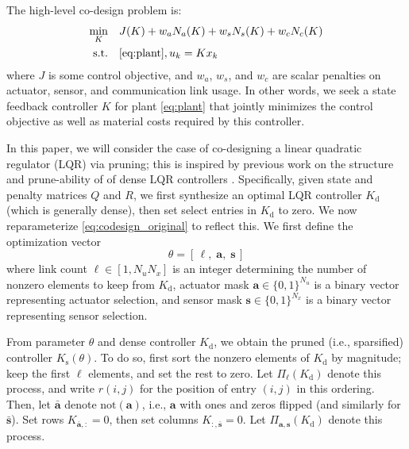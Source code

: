 \documentclass[letterpaper, 10pt, conference]{ieeeconf}
\begin{document}
The high-level co-design problem is:
\begin{equation} \label{eq:codesign_original}
\begin{aligned}
\min_{K} & \quad J(K) + w_a N_a(K) + w_s N_s(K) + w_c N_c(K) \\
\mathrm{s. t.} & \quad \eqref{eq:plant}, u_k = Kx_k
\end{aligned}
\end{equation}
where $J$ is some control objective, and $w_a$, $w_s$, and $w_c$ are scalar penalties on actuator, sensor, and communication link usage. In other words, we seek a state feedback controller $K$ for plant \eqref{eq:plant} that jointly minimizes the control objective as well as material costs required by this controller.

In this paper, we will consider the case of co-designing a linear quadratic regulator (LQR) via pruning; this is inspired by previous work on the structure and prune-ability of of dense LQR controllers \cite{shin}. Specifically, given state and penalty matrices $Q$ and $R$, we first synthesize an optimal LQR controller $K_\mathrm{d}$ (which is generally dense), then set select entries in $K_\mathrm{d}$ to zero. We now reparameterize \eqref{eq:codesign_original} to reflect this. We first define the optimization vector 
\begin{equation}
\theta = [\,\ell, \;\mathbf{a}, \;\mathbf{s}\,]
\end{equation}
where link count $\ell \in [1, N_u N_x]$ is an integer determining the number of nonzero elements to keep from $K_\mathrm{d}$, actuator mask $\mathbf{a} \in \{0, 1\}^{N_u}$ is a binary vector representing actuator selection, and sensor mask $\mathbf{s} \in \{0, 1\}^{N_x}$ is a binary vector representing sensor selection.

From parameter $\theta$ and dense controller $K_\mathrm{d}$, we obtain the pruned (i.e., sparsified) controller $K_\mathrm{s}(\theta)$. To do so, first sort the nonzero elements of $K_\mathrm{d}$ by magnitude; keep the first $\ell$ elements, and set the rest to zero. Let $\Pi_\ell(K_\mathrm{d})$ denote this process, and write $r(i,j)$ for the position of entry $(i,j)$ in this ordering. Then, let $\bar{\mathbf{a}}$ denote $\mathrm{not}(\mathbf{a})$, i.e., $\mathbf{a}$ with ones and zeros flipped (and similarly for $\bar{\mathbf{s}}$). Set rows $K_{\bar{\mathbf{a}},:} = 0$, then set columns $K_{:,\bar{\mathbf{s}}} = 0$. Let $\Pi_{\mathbf{a}, \mathbf{s}}(K_\mathrm{d})$ denote this process.
\end{document}
